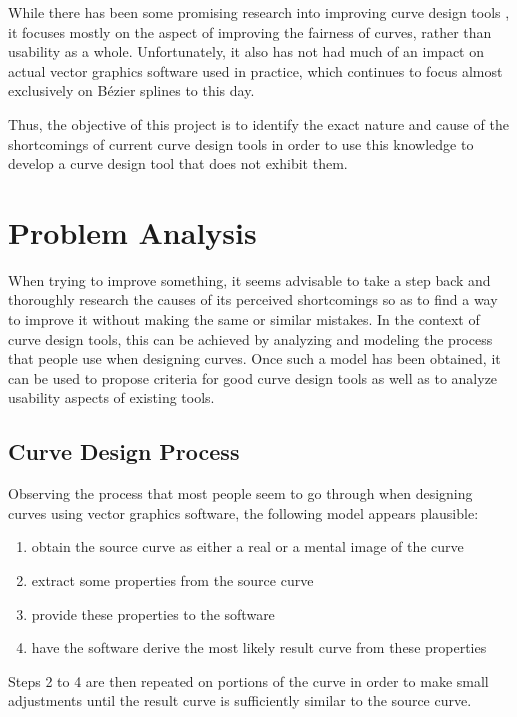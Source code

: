 \documentclass[a4paper]{article}
\begin{document}
		While there has been some promising research into improving curve design tools \cite{thesis-mvc} \cite{thesis-spiro}, it focuses mostly on the aspect of improving the fairness of curves, rather than usability as a whole. Unfortunately, it also has not had much of an impact on actual vector graphics software used in practice, which continues to focus almost exclusively on Bézier splines to this day.

		Thus, the objective of this project is to identify the exact nature and cause of the shortcomings of current curve design tools in order to use this knowledge to develop a curve design tool that does not exhibit them.

	\section{Problem Analysis}
	\label{section:problem_analysis}

		When trying to improve something, it seems advisable to take a step back and thoroughly research the causes of its perceived shortcomings so as to find a way to improve it without making the same or similar mistakes. In the context of curve design tools, this can be achieved by analyzing and modeling the process that people use when designing curves. Once such a model has been obtained, it can be used to propose criteria for good curve design tools as well as to analyze usability aspects of existing tools.

		\subsection{Curve Design Process}
		\label{section:curve_design_process}

			Observing the process that most people seem to go through when designing curves using vector graphics software, the following model appears plausible:
			\begin{enumerate}
				\item obtain the source curve as either a real or a mental image of the curve
				\item extract some properties from the source curve
				\item provide these properties to the software
				\item have the software derive the most likely result curve from these properties
			\end{enumerate}

			Steps 2 to 4 are then repeated on portions of the curve in order to make small adjustments until the result curve is sufficiently similar to the source curve.
\end{document}
